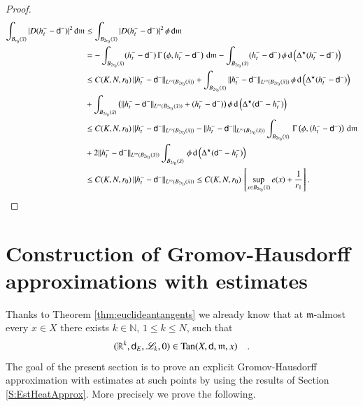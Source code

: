 \documentclass[11pt,reqno]{amsart}
\newcommand{\mm}{\mathfrak m}
\newcommand{\sfd}{{\sf d}}
\newcommand{\LL}{\mathscr{L}}
\renewcommand{\d}{{\rm{d}}}
\newcommand{\R}{\mathbb{R}}
\newcommand{\N}{\mathbb{N}}
\newcommand{\Tan}{{\rm Tan}}
\theoremstyle{definition}
\theoremstyle{remark}
\theoremstyle{remark}
\theoremstyle{remark}
\theoremstyle{remark}
\theoremstyle{remark}
\theoremstyle{remark}
\theoremstyle{remark}
\begin{document}
\begin{proof}
 \begin{align}
\int_{B_{r_{0}}(\bar{x})} |D (h^{-}_{t} -\sfd^{-})|^2 \,	\d \mm& \leq \int_{B_{2r_{0}}(\bar{x})}  |D (h^{-}_{t} -\sfd^{-})|^2 \, \phi \, \d \mm  \nonumber  \\
&= -  \int_{B_{2r_{0}}(\bar{x})}   (h^{-}_{t} -\sfd^{-}) \, \Gamma \left(\phi, h^{-}_{t} -\sfd^{-}\right)  \, \d \mm - \int_{B_{2r_{0}}(\bar{x})}  (h^{-}_{t} -\sfd^{-}) \, \phi  \, \d \left({\Delta^{\star}}(h^{-}_{t} -\sfd^{-}) \right)   \nonumber  \\
&\leq C(K,N,r_{0})\, \|h^{-}_{t}-\sfd^{-} \|_{L^{\infty}(B_{2r_{0}}(\bar{x}))}   +  \int_{B_{2r_{0}}(\bar{x})}   \|h^{-}_{t}-\sfd^{-} \|_{L^{\infty}(B_{2r_{0}}(\bar{x}))}\,  \phi  \, \d \left( {\Delta^{\star}} ( h^{-}_{t}- \sfd^{-} ) \right)              \nonumber  \\
& +   \int_{B_{2r_{0}}(\bar{x})}  \big( \|h^{-}_{t}-\sfd^{-} \|_{L^{\infty}(B_{2r_{0}}(\bar{x}))} + (h^{-}_{t}-\sfd^{-}) \big) \, \phi  \, \d \left( {\Delta^{\star}}  (\sfd^{-}-h^{-}_{t}) \right)      \nonumber  \\
&\leq C(K,N,r_{0})\, \|h^{-}_{t}-\sfd^{-} \|_{L^{\infty}(B_{2r_{0}}(\bar{x}))}        -    \|h^{-}_{t}-\sfd^{-} \|_{L^{\infty}(B_{2r_{0}}(\bar{x}))} \int_{B_{2r_{0}}(\bar{x})} \,  \Gamma\left(\phi,  ( h^{-}_{t}- \sfd^{-} ) \right) \, \d \mm    \nonumber  \\
& +   2\|h^{-}_{t}-\sfd^{-} \|_{L^{\infty}(B_{2r_{0}}(\bar{x}))}   \int_{B_{2r_{0}}(\bar{x})}  \, \phi  \, \d \left( {\Delta^{\star}} ( \sfd^{-}-h^{-}_{t}) \right)           \nonumber  \\
&\leq   C(K,N,r_{0})\, \|h^{-}_{t}-\sfd^{-} \|_{L^{\infty}(B_{2r_{0}}(\bar{x}))} \leq  C(K,N,r_{0}) \, \left[ \sup_{x \in B_{2 r_{0}}(\bar{x})} e(x) +  \frac{1}{r_1} \right].   \nonumber
\end{align}

\end{proof}

\section{Construction of Gromov-Hausdorff approximations with  estimates}\label{s:Gromov_Hausdorff}
Thanks to Theorem \ref{thm:euclideantangents} we already know that  at $\mm$-almost every $x \in X$ there exists $k \in \N$, $1 \le k \le N$, such that 
 $$
  (\R^k,\sfd_{E},\LL_k,0) \in \Tan(X,\sfd,\mm,x) \quad.  
 $$
The goal of the present section is to prove an explicit Gromov-Hausdorff approximation with estimates at such points by using the results of Section \ref{S:EstHeatApprox}. More precisely we prove the following.
\end{document}
